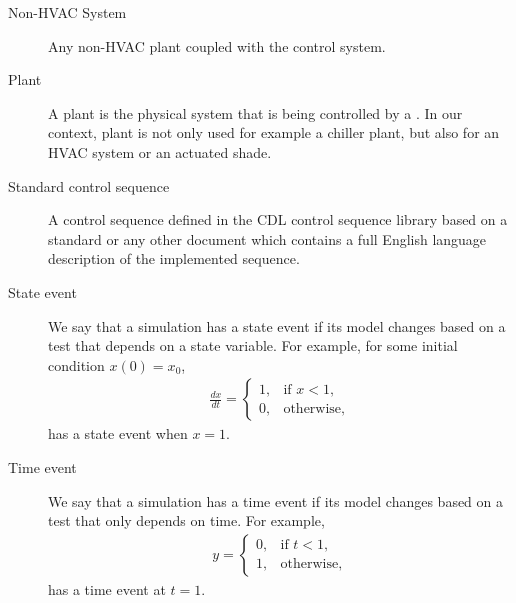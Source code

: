 \documentclass[letterpaper,10pt, openany,english]{sphinxmanual}
\begin{document}
\begin{description}
\item[{Non-HVAC System\label{\detokenize{glossary:term-non-hvac-system}}}] \leavevmode
Any non-HVAC plant coupled with the control system.

\item[{Plant\label{\detokenize{glossary:term-plant}}}] \leavevmode
A plant is the physical system that is being controlled by a {\hyperref[\detokenize{glossary:term-controller}]{}}.
In our context, plant is not only used for example a chiller plant, but also
for an HVAC system or an actuated shade.

\item[{Standard control sequence\label{\detokenize{glossary:term-standard-control-sequence}}}] \leavevmode
A control sequence defined in the CDL control sequence library based on a standard or
any other document which contains a full English language description of the
implemented sequence.

\item[{State event\label{\detokenize{glossary:term-state-event}}}] \leavevmode
We say that a simulation has a state event if its model changes based on a test
that depends on a state variable. For example, for some initial condition \(x(0)=x_0\),
\begin{equation*}
\begin{split}\frac{dx}{dt} =
\begin{cases}
  1,  & \text{if } x < 1, \\
  0,  & \text{otherwise,}
\end{cases}\end{split}
\end{equation*}
has a state event when \(x=1\).

\item[{Time event\label{\detokenize{glossary:term-time-event}}}] \leavevmode
We say that a simulation has a time event if its model changes based on a test
that only depends on time. For example,
\begin{equation*}
\begin{split}y =
\begin{cases}
  0, & \text{if } t < 1, \\
  1, & \text{otherwise,}
 \end{cases}\end{split}
\end{equation*}
has a time event at \(t=1\).

\end{description}
\end{document}

